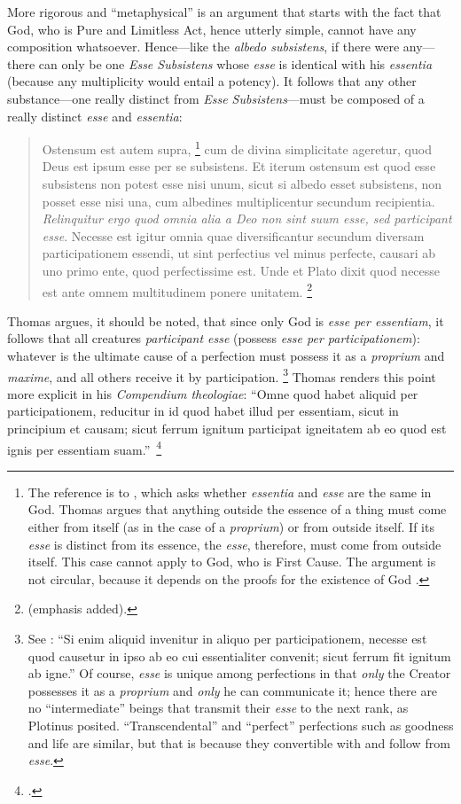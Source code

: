 More rigorous and “metaphysical” is an argument that starts with the fact that God, who is Pure and Limitless Act, hence utterly simple, cannot have any composition whatsoever. Hence—like the \emph{albedo subsistens}, if there were any—there can only be one \emph{Esse Subsistens} whose \emph{esse} is identical with his \emph{essentia} (because any multiplicity would entail a potency). It follows that any other substance—one really distinct from \emph{Esse Subsistens}—must be composed of a really distinct \emph{esse} and \emph{essentia}:
\begin{quotation}
Ostensum est autem supra,%
%
\footnote{The reference is to \cite[I, q.~3, a.~4]{st:summa}, which asks whether \emph{essentia} and \emph{esse} are the same in God. Thomas argues that anything outside the essence of a thing must come either from itself (as in the case of a \emph{proprium}) or from outside itself. If its \emph{esse} is distinct from its essence, the \emph{esse}, therefore, must come from outside itself. This case cannot apply to God, who is First Cause. The argument is not circular, because it depends on the proofs for the existence of God \parencite[I, q.~2, a.~3]{st:summa}.}
%
cum de divina simplicitate ageretur, quod Deus est ipsum esse per se subsistens. Et iterum ostensum est quod esse subsistens non potest esse nisi unum, sicut si albedo esset subsistens, non posset esse nisi una, cum albedines multiplicentur secundum recipientia. \emph{Relinquitur ergo quod omnia alia a Deo non sint suum esse, sed participant esse}. Necesse est igitur omnia quae diversificantur secundum diversam participationem essendi, ut sint perfectius vel minus perfecte, causari ab uno primo ente, quod perfectissime est. Unde et Plato dixit quod necesse est ante omnem multitudinem ponere unitatem.%
%
\footnote{\Cite[I, q.~44, a.~1, co.]{st:summa} (emphasis added).}
%
\end{quotation}
Thomas argues, it should be noted, that since only God is \emph{esse per essentiam}, it follows that all creatures \emph{participant esse} (possess \emph{esse per participationem}): whatever is the ultimate cause of a perfection must possess it as a \emph{proprium} and \emph{maxime}, and all others receive it by participation.%
%
\footnote{See \cite[I, q.~44, a.~1, co.]{st:summa}{}: “Si enim aliquid invenitur in aliquo per participationem, necesse est quod causetur in ipso ab eo cui essentialiter convenit; sicut ferrum fit ignitum ab igne.” Of course, \emph{esse} is unique among perfections in that \emph{only} the Creator possesses it as a \emph{proprium} and \emph{only} he can communicate it; hence there are no “intermediate” beings that transmit their \emph{esse} to the next rank, as Plotinus posited. “Transcendental” and “perfect” perfections such as goodness and life are similar, but that is because they convertible with and follow from \emph{esse}.} Thomas renders this point more explicit in his \emph{Compendium theologiae}: “Omne quod habet aliquid per participationem, reducitur in id quod habet illud per essentiam, sicut in principium et causam; sicut ferrum ignitum participat igneitatem ab eo quod est ignis per essentiam suam.”\,%
%
\footnote{\Cite[I,  cap.~68]{st:compendium}.} 

